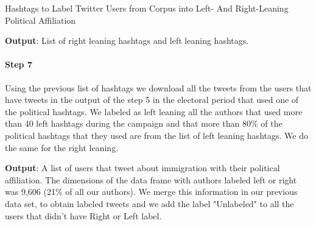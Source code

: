        
        
    
        
        \begin{table}[!htb]
            \centering
            
            
            \caption{Hashtags to Label Twitter Users from Corpus into Left- And Right-Leaning Political Affiliation}
            
            \label{tab_hashtag_left_right_split}
        \end{table}
        
        \textbf{Output}: List of right leaning hashtags and left leaning hashtags.
    
    
        \paragraph{Step 7} 
        
        Using the previous list of hashtags we download all the tweets from the users that have tweets in the output of the step 5 in the electoral period that used one of the political hashtags. We labeled as left leaning all the authors that used more than 40 left hashtags during the campaign and that more than 80\% of the political hashtags that they used are from the list of left leaning hashtags. We do the same for the right leaning.
        
        \textbf{Output}: A list of users that tweet about immigration with their political affiliation. The dimensions of the data frame with authors labeled left or right was 9,606 (21\% of all our authors). We merge this information in our previous data set, to obtain labeled tweets and we add the label "Unlabeled" to all the users that didn't have Right or Left label. 
        
